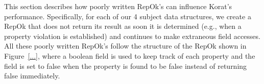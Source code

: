 This section describes how poorly written RepOk's can influence
Korat's performance.  Specifically, for each of our 4 subject data
structures, we create a RepOk that does not return its result as soon
it is determined (e.g., when a property violation is established) and
continues to make extraneous field accesses.  All these poorly written
RepOk's follow the structure of the RepOk shown in Figure~\ref{...},
where a boolean field is used to keep track of each property and the
field is set to false when the property is found to be false instead
of returning false immediately.

\begin{table}[h]
\end{table}
